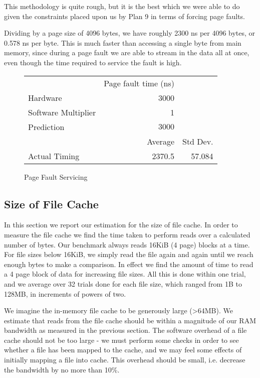 \documentclass[letterpaper,twocolumn,10pt]{article}
\begin{document}
This methodology is quite rough, but it is the best which we were able to do given the constraints placed upon 
us by Plan 9 in terms of forcing page faults.

Dividing by a page size of 4096 bytes, we have roughly 2300 ns per 4096 bytes, or 0.578 ns per byte. This is much faster than accessing a single byte from main memory, since during a page fault we are able to stream in the data all at once, even though the time required to service the fault is high.

\begin{figure}
	\centering
    \begin{tabular}{l r r}
      & Page fault time (ns) \\
      Hardware & 3000\\
      Software Multiplier & 1 \\
      Prediction & $3000$ \\
                   & Average & Std Dev.\\
      Actual Timing & 2370.5 & 57.084 \\
\end{tabular}
\caption{Page Fault Servicing}
\label{tab:pagefault}
\end{figure}

\subsection{Size of File Cache}
In this section we report our estimation for the size of file cache. In order to
measure the file cache we find the time taken to perform reads over a calculated
number of bytes. Our benchmark always reads 16KiB (4 page) blocks at a time. For
file sizes below 16KiB, we simply read the file again and again until we reach
enough bytes to make a comparison. In effect we find the amount of time to read
a 4 page block of data for increasing file sizes. All this is done within one
trial, and we average over 32 trials done for each file size, which ranged
from 1B to 128MB, in increments of powers of two.

We imagine the in-memory file cache to be generously large (>64MB). We estimate
that reads from the file cache should be within a magnitude of our RAM bandwidth
as measured in the previous section. The software overhead of a file cache should
not be too large - we must perform some checks in order to see whether a file
has been mapped to the cache, and we may feel some effects of initially mapping
a file into cache. This overhead should be small, i.e. decrease the bandwidth
by no more than 10\%.
\end{document}
